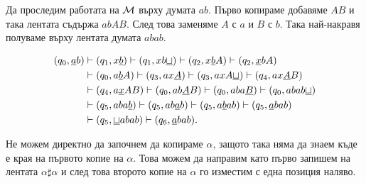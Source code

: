 \begin{example}
\begin{framed}
\begin{figure}[H]
\begin{center}
    \end{center}
  \end{figure}
\end{framed}

Да проследим работата на $\mathcal{M}$ върху думата $ab$.
Първо копираме добавяме $AB$ и така лентата съдържа $abAB$. 
След това заменяме $A$ с $a$ и $B$ с $b$. Така най-накравя полуваме върху лентата думата $abab$.

\begin{align*}
  (q_0, \underline{a}b) & \vdash (q_1, x\underline{b}) \vdash (q_1,xb\underline{\sqcup}) \vdash (q_2, x\underline{b}A) \vdash (q_2, \underline{x}bA)\\
                        & \vdash (q_0, a\underline{b}A) \vdash (q_3, ax\underline{A}) \vdash (q_3, axA\underline{\sqcup}) \vdash (q_4, ax\underline{A}B)\\
                        & \vdash (q_4, a\underline{x}AB) \vdash (q_0, ab\underline{A}B) \vdash (q_0,aba\underline{B}) \vdash (q_0, abab\underline{\sqcup})\\
                        & \vdash (q_5, aba\underline{b}) \vdash (q_5, ab\underline{a}b) \vdash (q_5, a\underline{b}ab) \vdash (q_5, \underline{a}bab)\\
                        & \vdash (q_5, \underline{\sqcup}abab) \vdash (q_6, \underline{a}bab).
\end{align*}

Не можем директно да започнем да копираме $\alpha$, защото така няма да знаем къде е края на първото копие на $\alpha$.
Това можем да направим като първо запишем на лентата $\alpha \sharp \alpha$ и след това второто копие на $\alpha$ го изместим с една позиция наляво.
\end{example}


